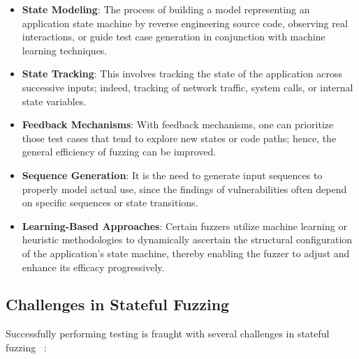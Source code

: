 \begin{itemize}
    \item \textbf{State Modeling}: The process of building a model representing an application state machine by reverse engineering source code, observing real interactions, or guide test case generation in conjunction with machine learning techniques.
    
    \item \textbf{State Tracking}: This involves tracking the state of the application across successive inputs; indeed, tracking of network traffic, system calls, or internal state variables.
    
    \item \textbf{Feedback Mechanisms}: With feedback mechanisms, one can prioritize those test cases that tend to explore new states or code paths; hence, the general efficiency of fuzzing can be improved.
    
    \item \textbf{Sequence Generation}: It is the need to generate input sequences to properly model actual use, since the findings of vulnerabilities often depend on specific sequences or state transitions.
    
    \item \textbf{Learning-Based Approaches}: Certain fuzzers utilize machine learning or heuristic methodologies to dynamically ascertain the structural configuration of the application's state machine, thereby enabling the fuzzer to adjust and enhance its efficacy progressively.
\end{itemize}

\subsection{Challenges in Stateful Fuzzing}
Successfully performing testing is fraught with several challenges in stateful fuzzing ~\cite{statefulfuzzingchallenges}:

